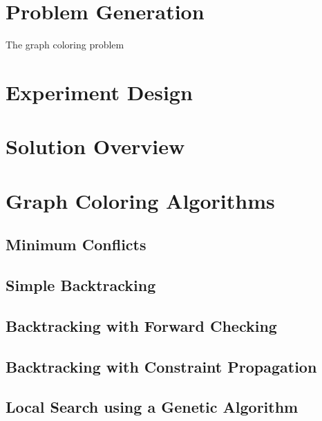\documentclass[twoside]{article}
\begin{document}
\begin{multicols}{2}
\section{Problem Generation}
The graph coloring problem
\section{Experiment Design}

\section{Solution Overview}

\section{Graph Coloring Algorithms}
\subsection{Minimum Conflicts}
\subsection{Simple Backtracking}
\subsection{Backtracking with Forward Checking}
\subsection{Backtracking with Constraint Propagation}
\subsection{Local Search using a Genetic Algorithm}


\end{multicols}

%	
%	
\end{document}
